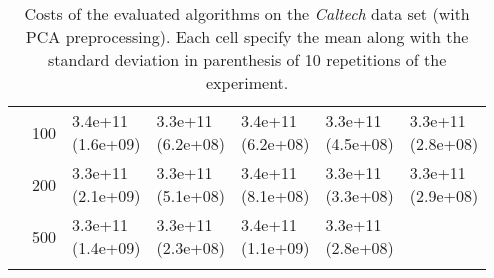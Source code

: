 \begin{longtable}{lllllll}
   & 100 &  \parbox[t]{17mm}{3.4e+11\\\small(1.6e+09)} &  \parbox[t]{17mm}{3.3e+11\\\small(6.2e+08)} &  \parbox[t]{17mm}{3.4e+11\\\small(6.2e+08)} &  \parbox[t]{17mm}{3.3e+11\\\small(4.5e+08)} &  \parbox[t]{17mm}{3.3e+11\\\small(2.8e+08)} \\
   & 200 &  \parbox[t]{17mm}{3.3e+11\\\small(2.1e+09)} &  \parbox[t]{17mm}{3.3e+11\\\small(5.1e+08)} &  \parbox[t]{17mm}{3.4e+11\\\small(8.1e+08)} &  \parbox[t]{17mm}{3.3e+11\\\small(3.3e+08)} &  \parbox[t]{17mm}{3.3e+11\\\small(2.9e+08)} \\
   & 500 &  \parbox[t]{17mm}{3.3e+11\\\small(1.4e+09)} &  \parbox[t]{17mm}{3.3e+11\\\small(2.3e+08)} &  \parbox[t]{17mm}{3.4e+11\\\small(1.1e+09)} &  \parbox[t]{17mm}{3.3e+11\\\small(2.8e+08)} &                 \\
\bottomrule
\caption{Costs of the evaluated algorithms on the \textit{Caltech} data set (with PCA preprocessing). Each cell specify the mean along with the standard deviation in parenthesis of 10 repetitions of the experiment.}
\label{tab:real-cost-mean-std-caltech-pca}
\end{longtable}

